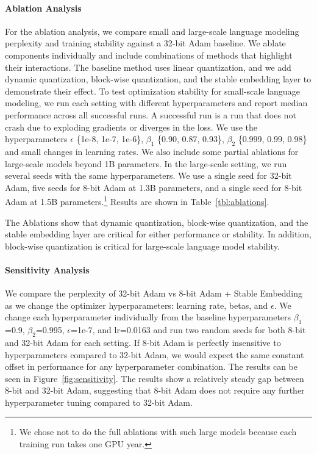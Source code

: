 \paragraph{Ablation Analysis}
\label{section:ablations}

For the ablation analysis, we compare small and large-scale language modeling perplexity and training stability against a 32-bit Adam baseline. We ablate components individually and include combinations of methods that highlight their interactions. The baseline method uses linear quantization, and we add dynamic quantization, block-wise quantization, and the stable embedding layer to demonstrate their effect. To test optimization stability for small-scale language modeling, we run each setting with different hyperparameters and report median performance across all successful runs. A successful run is a run that does not crash due to exploding gradients or diverges in the loss. We use the hyperparameters $\epsilon$ \{1e-8, 1e-7, 1e-6\}, $\beta_1$ \{0.90, 0.87, 0.93\}, $\beta_2$ \{0.999, 0.99, 0.98\} and small changes in learning rates. We also include some partial ablations for large-scale models beyond 1B parameters. In the large-scale setting, we run several seeds with the same hyperparameters. We use a single seed for 32-bit Adam, five seeds for 8-bit Adam at 1.3B parameters, and a single seed for 8-bit Adam at 1.5B parameters.\footnote{We chose not to do the full ablations with such large models because each training run takes one GPU year.} Results are shown in Table~\ref{tbl:ablations}. 

The Ablations show that dynamic quantization, block-wise quantization, and the stable embedding layer are critical for either performance or stability. In addition, block-wise quantization is critical for large-scale language model stability.

\paragraph{Sensitivity Analysis}

We compare the perplexity of 32-bit Adam vs 8-bit Adam + Stable Embedding as we change the optimizer hyperparameters: learning rate, betas, and $\epsilon$. We change each hyperparameter individually from the baseline hyperparameters $\beta_1$=0.9, $\beta_2$=0.995, $\epsilon$=1e-7, and lr=0.0163 and run two random seeds for both 8-bit and 32-bit Adam for each setting. If 8-bit Adam is perfectly insensitive to hyperparameters compared to 32-bit Adam, we would expect the same constant offset in performance for any hyperparameter combination. The results can be seen in Figure~\ref{fig:sensitivity}. The results show a relatively steady gap between 8-bit and 32-bit Adam, suggesting that 8-bit Adam does not require any further hyperparameter tuning compared to 32-bit Adam.


